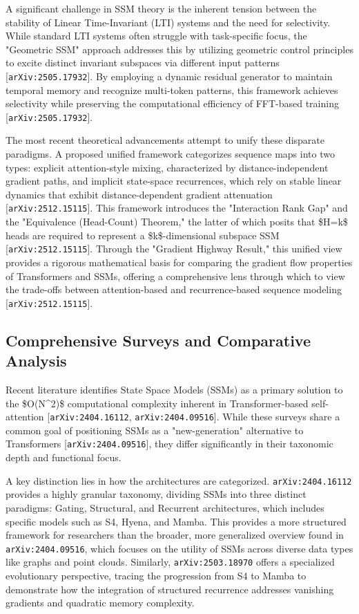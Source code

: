 \documentclass[11pt]{article}
\begin{document}
A significant challenge in SSM theory is the inherent tension between the stability of Linear Time-Invariant (LTI) systems and the need for selectivity. While standard LTI systems often struggle with task-specific focus, the "Geometric SSM" approach addresses this by utilizing geometric control principles to excite distinct invariant subspaces via different input patterns [\texttt{arXiv:2505.17932}]. By employing a dynamic residual generator to maintain temporal memory and recognize multi-token patterns, this framework achieves selectivity while preserving the computational efficiency of FFT-based training [\texttt{arXiv:2505.17932}].

The most recent theoretical advancements attempt to unify these disparate paradigms. A proposed unified framework categorizes sequence maps into two types: explicit attention-style mixing, characterized by distance-independent gradient paths, and implicit state-space recurrences, which rely on stable linear dynamics that exhibit distance-dependent gradient attenuation [\texttt{arXiv:2512.15115}]. This framework introduces the "Interaction Rank Gap" and the "Equivalence (Head-Count) Theorem," the latter of which posits that \$H=k\$ heads are required to represent a \$k\$-dimensional subspace SSM [\texttt{arXiv:2512.15115}]. Through the "Gradient Highway Result," this unified view provides a rigorous mathematical basis for comparing the gradient flow properties of Transformers and SSMs, offering a comprehensive lens through which to view the trade-offs between attention-based and recurrence-based sequence modeling [\texttt{arXiv:2512.15115}].

\subsection{Comprehensive Surveys and Comparative Analysis}

Recent literature identifies State Space Models (SSMs) as a primary solution to the \$O(N\textasciicircum{}2)\$ computational complexity inherent in Transformer-based self-attention [\texttt{arXiv:2404.16112}, \texttt{arXiv:2404.09516}]. While these surveys share a common goal of positioning SSMs as a "new-generation" alternative to Transformers [\texttt{arXiv:2404.09516}], they differ significantly in their taxonomic depth and functional focus.

A key distinction lies in how the architectures are categorized. \texttt{arXiv:2404.16112} provides a highly granular taxonomy, dividing SSMs into three distinct paradigms: Gating, Structural, and Recurrent architectures, which includes specific models such as S4, Hyena, and Mamba. This provides a more structured framework for researchers than the broader, more generalized overview found in \texttt{arXiv:2404.09516}, which focuses on the utility of SSMs across diverse data types like graphs and point clouds. Similarly, \texttt{arXiv:2503.18970} offers a specialized evolutionary perspective, tracing the progression from S4 to Mamba to demonstrate how the integration of structured recurrence addresses vanishing gradients and quadratic memory complexity.
\end{document}
